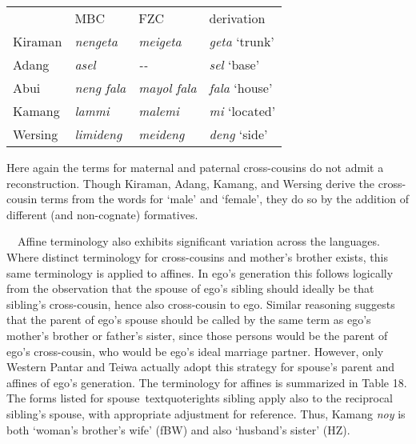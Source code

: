 \begin{center}
\tablehead{}
\begin{supertabular}{m{0.6545598in}m{0.9205598in}m{0.9504598in}m{0.98025984in}}
 &
MBC &
FZC &
derivation\\
Kiraman &
\textit{nengeta} &
\textit{meigeta} &
\textit{geta }{\textquoteleft}trunk{\textquoteright}\\
Adang &
\textit{asel} &
\textit{{}-{}-} &
\textit{sel }{\textquoteleft}base{\textquoteright}\\
Abui &
\textit{neng fala} &
\textit{mayol fala} &
\textit{fala} {\textquoteleft}house{\textquoteright}\\
Kamang &
\textit{lammi} &
\textit{malemi} &
\textit{mi }{\textquoteleft}located{\textquoteright}\\
Wersing &
\textit{limideng} &
\textit{meideng} &
\textit{deng }{\textquoteleft}side{\textquoteright}\\
\end{supertabular}
\end{center}
Here again the terms for maternal and paternal cross-cousins do not admit a reconstruction. Though Kiraman, Adang, Kamang, and Wersing derive the cross-cousin terms from the words for {\textquoteleft}male{\textquoteright} and {\textquoteleft}female{\textquoteright}, they do so by the addition of different (and non-cognate) formatives. 

\ \ Affine terminology also exhibits significant variation across the languages. Where distinct terminology for cross-cousins and mother{\textquoteright}s brother exists, this same terminology is applied to affines. In ego{\textquoteright}s generation this follows logically from the observation that the spouse of ego{\textquoteright}s sibling should ideally be that sibling{\textquoteright}s cross-cousin, hence also cross-cousin to ego. Similar reasoning suggests that the parent of ego{\textquoteright}s spouse should be called by the same term as ego{\textquoteright}s mother{\textquoteright}s brother or father{\textquoteright}s sister, since those persons would be the parent of ego{\textquoteright}s cross-cousin, who would be ego{\textquoteright}s ideal marriage partner. However, only Western Pantar and Teiwa actually adopt this strategy for spouse{\textquoteright}s parent and affines of ego{\textquoteright}s generation. The terminology for affines is summarized in Table 18. The forms listed for spouse{\
textquoteright}s sibling apply also to the reciprocal sibling{\textquoteright}s spouse, with appropriate adjustment for reference. Thus, Kamang \textit{noy }is both {\textquoteleft}woman{\textquoteright}s brother{\textquoteright}s wife{\textquoteright} (fBW) and also {\textquoteleft}husband{\textquoteright}s sister{\textquoteright} (HZ).

